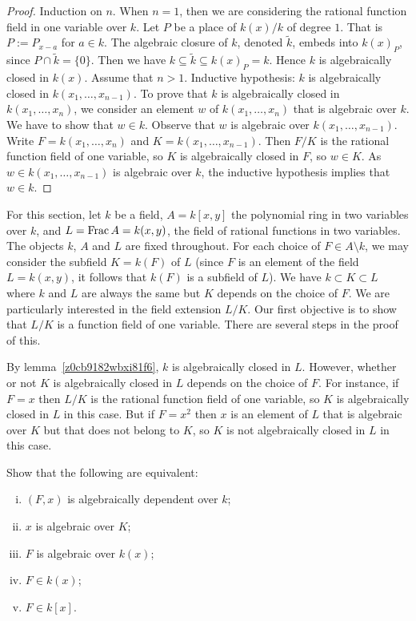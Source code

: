 \begin{proof}
	Induction on $n$. When $n= 1$, then we are considering 
	the rational function field in one variable over $k $.
	Let $P$ be a place of $k(x)/k$ of degree $1$. That is
	$P:=P_{x-a}$ for $a \in k$. The algebraic closure of 
	$k$, denoted $\tilde{k}$, embeds into $k(x)_P$, since 
	$P \cap \tilde{k} = \lbrace 0 \rbrace$. Then we have 
	$k \subseteq \tilde{k} \subseteq k(x)_P = k$. 
	Hence $k$ is algebraically closed in $k(x)$. 
	Assume that $n>1$.
	Inductive hypothesis: $k$ is algebraically closed 
	in $k(x_1, \dots, x_{n-1})$.
	To prove that $k$ is algebraically closed in $k(x_1, \dots, x_n)$, we consider
	an element $w$ of $k(x_1, \dots, x_n)$ that is algebraic 
	over $k$. We have to show that $w \in k$.
	Observe that $w$ is algebraic over $k(x_1, \dots, x_{n-1})$.
	Write $F = k(x_1, \dots, x_{n})$ and $K = k(x_1, \dots, x_{n-1})$.
	Then $F/K$ is the rational function field of one variable, 
	so $K$ is algebraically closed in $F$, so $w \in K$.
	As $w \in k(x_1, \dots, x_{n-1})$ is algebraic over $k$, 
	the inductive hypothesis implies that $w \in k$.
\end{proof}

For this section, let $ k$ be a field, $A =  k[x,y]$ 
the polynomial ring in two variables over $ k$,
and $L= \operatorname{{\rm Frac}} A =  k(x,y)$, the field of rational functions in two variables.
The objects $ k$, $A$ and $L$ are fixed throughout.
For each choice of $F \in A \setminus  k$, 
we may consider the subfield $K= k(F)$ of $L$
(since $F$ is an element of the field $L =  k(x,y)$, 
it follows that $ k(F)$ is a subfield of $L$).
We have $ k \subset K \subset L$ where $ k$ 
and $L$ are always the same but $K$ depends on the choice of $F$.
We are particularly interested in the field extension $L/K$.
Our first objective is to show that $L/K$ is a function field 
of one variable.
There are several steps in the proof of this.

\begin{remark}
	By lemma~\ref{z0cb9182wbxi81f6}, $ k$ is algebraically closed in $L$.
	However, whether or not $K$ is algebraically closed in $L$ depends on the choice of $F$.
	For instance, if $F=x$ then $L/K$ is the rational function field of one variable, so $K$ is algebraically closed 
	in $L$ in this case.  But if $F = x^2$ then $x$ is an element of $L$ that is algebraic over $K$ but that does not 
	belong to $K$, so $K$ is not algebraically closed in $L$ in this case.
\end{remark}

\begin{proposition} \label {90cdk2938db129}
	Show that the following are equivalent:
	\begin{enumerate}[(i)]
	\item \label{fact1} $(F,x)$ is algebraically dependent over $ k$;
	\item \label{fact2} $x$ is algebraic over $K$;
	\item \label{fact3} $F$ is algebraic over $ k(x)$;
	\item \label{fact4} $F \in  k(x)$;
	\item \label{fact5} $F \in  k[x]$.
	\end{enumerate}
\end{proposition}

